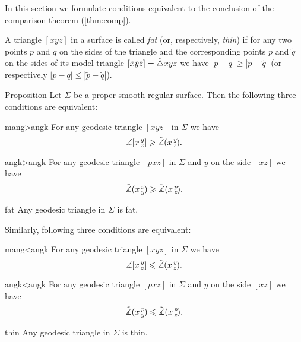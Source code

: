 In this section we formulate conditions equivalent to the conclusion of the comparison theorem (\ref{thm:comp}).

A triangle $[xyz]$ in a surface is called \emph{fat} (or, respectively, \emph{thin})
if for any two points $p$ and $q$ on the sides of the triangle and the corresponding points 
$\tilde p$ and $\tilde q$ on the sides of its model triangle $[\tilde x\tilde y\tilde z]\z=\tilde\triangle xyz$ we have
$|p-q|\ge |\tilde p-\tilde q|$ (or respectively $|p-q|\le |\tilde p-\tilde q|$).


\begin{thm}{Proposition}\label{prop:comp-reformulations}
Let $\Sigma$ be a proper smooth regular surface.
Then the following three conditions are equivalent:

\begin{subthm}{mang>angk}
For any geodesic triangle $[xyz]$ in $\Sigma$ we have
 \[\measuredangle[x\,{}^{y}_{z}]\geqslant\tilde\measuredangle(x\,{}^{y}_{z}\hspace{-0.2ex}).\]
\end{subthm}

\begin{subthm}{angk>angk} For any geodesic triangle $[pxz]$ in $\Sigma$ and $y$ on the side $[xz]$ we have
 \[\tilde\measuredangle(x\,{}^{p}_{y}\hspace{-0.2ex}) \geqslant \tilde\measuredangle(x\,{}^{p}_{z}\hspace{-0.2ex}).\]
 
\end{subthm}

\begin{subthm}{fat}
 Any geodesic triangle in $\Sigma$ is fat.
\end{subthm}


\medskip

Similarly, following three conditions are equivalent:

\begin{subthmA}{mang<angk}
For any geodesic triangle $[xyz]$ in $\Sigma$ we have
 \[\measuredangle[x\,{}^{y}_{z}]\leqslant\tilde\measuredangle(x\,{}^{y}_{z}\hspace{-0.2ex}).\]
\end{subthmA}

\begin{subthmA}{angk<angk} For any geodesic triangle $[pxz]$ in $\Sigma$ and $y$ on the side $[xz]$ we have
 \[\tilde\measuredangle(x\,{}^{p}_{y}\hspace{-0.2ex}) \leqslant \tilde\measuredangle(x\,{}^{p}_{z}\hspace{-0.2ex}).\]
\end{subthmA}

\begin{subthmA}{thin}
Any geodesic triangle in $\Sigma$ is thin.
\end{subthmA}

\end{thm}

